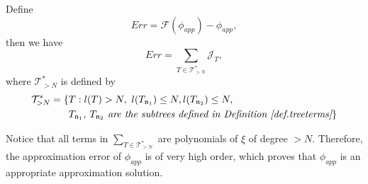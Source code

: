 \begin{lem}\label{lem.approxerror} Define 
\begin{equation}
    Err=\mathcal{F}(\phi_{app})-\phi_{app},
\end{equation}
then we have 
\begin{equation}\label{eq.approxerror}
    Err=\sum_{T\in \mathcal{T}_{>N}^*} \mathcal{J}_T,
\end{equation}
where $\mathcal{T}_{>N}^*$ is defined by
\begin{equation}
\begin{split}
    \mathcal{T}_{>N}^*=\{&T:l(T)>N,\ l(T_{\mathfrak{n}_1})\le N,
    l(T_{\mathfrak{n}_2})\le N,
    \\
    &\textit{$T_{\mathfrak{n}_1}$, $T_{\mathfrak{n}_2}$ are the subtrees defined in Definition \ref{def.treeterms}} \}
\end{split}
\end{equation}
\end{lem}

\begin{rem}
Notice that all terms in $\sum_{T\in \mathcal{T}_{>N}^*}$ are polynomials of $\xi$ of degree $>N$. Therefore, the approximation error of $\phi_{app}$ is of very high order, which proves that $\phi_{app}$ is an appropriate approximation solution. 
\end{rem}


